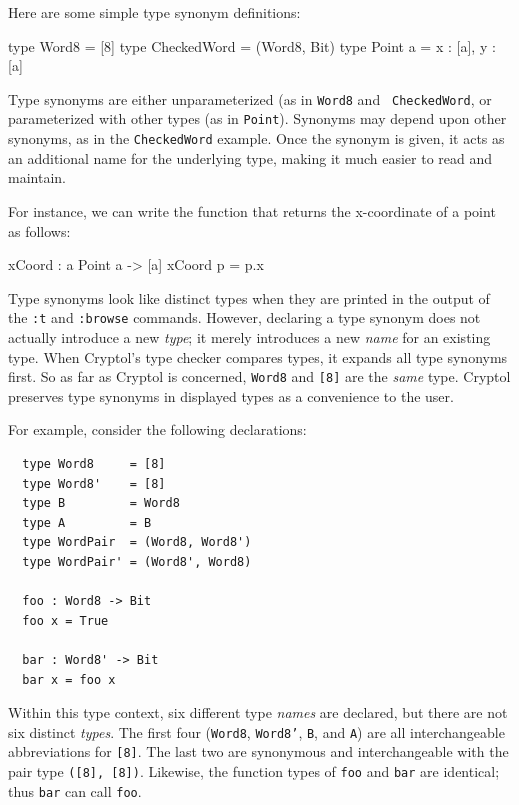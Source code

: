 
Here are some simple type synonym definitions:
\begin{code}
  type Word8       = [8]
  type CheckedWord = (Word8, Bit)
  type Point a     = {x : [a], y : [a]}
\end{code}


Type synonyms are either unparameterized (as in {\tt Word8} and {\tt
  CheckedWord}, or parameterized with other types (as in {\tt Point}).
Synonyms may depend upon other synonyms, as in the {\tt CheckedWord}
example.  Once the synonym is given, it acts as an additional name for
the underlying type, making it much easier to read and
maintain.

For instance, we can write the function that returns the x-coordinate
of a point as follows:
\begin{code}
  xCoord : {a} Point a -> [a]
  xCoord p = p.x
\end{code}

Type synonyms look like distinct types when they are printed in the
output of the \texttt{:t} and \texttt{:browse} commands. However,
declaring a type synonym does not actually introduce a new
\emph{type}; it merely introduces a new \emph{name} for an existing
type. When Cryptol's type checker compares types, it expands all type
synonyms first. So as far as Cryptol is concerned, \texttt{Word8} and
\texttt{[8]} are the \emph{same} type. Cryptol preserves type synonyms
in displayed types as a convenience to the user.

For example, consider the following declarations:
\begin{Verbatim}
  type Word8     = [8]
  type Word8'    = [8]
  type B         = Word8
  type A         = B
  type WordPair  = (Word8, Word8')
  type WordPair' = (Word8', Word8)

  foo : Word8 -> Bit
  foo x = True

  bar : Word8' -> Bit
  bar x = foo x
\end{Verbatim}
Within this type context, six different type \emph{names} are
declared, but there are not six distinct \emph{types}. The first four
(\texttt{Word8}, \texttt{Word8'}, \texttt{B}, and \texttt{A}) are all
interchangeable abbreviations for \texttt{[8]}. The last two are
synonymous and interchangeable with the pair type \texttt{([8], [8])}.
Likewise, the function types of \texttt{foo} and \texttt{bar} are
identical; thus \texttt{bar} can call \texttt{foo}.

